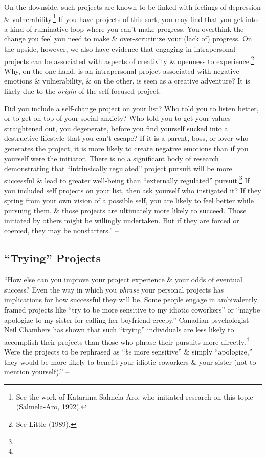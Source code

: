 \documentclass{article}
\numberwithin{equation}{section}
\begin{document}
On the downside, such projects are known to be linked with feelings of depression \& vulnerability.\footnote{See the work of Katariina Salmela-Aro, who initiated research on this topic (Salmela-Aro, 1992).} If you have projects of this sort, you may find that you get into a kind of ruminative loop where you can't make progress. You overthink the change you feel you need to make \& over-scrutinize your (lack of) progress. On the upside, however, we also have evidence that engaging in intrapersonal projects can be associated with aspects of creativity \& openness to experience.\footnote{See Little (1989).} Why, on the one hand, is an intrapersonal project associated with negative emotions \& vulnerability, \& on the other, is seen as a creative adventure? It is likely due to the \textit{origin} of the self-focused project.

Did you include a self-change project on your list? Who told you to listen better, or to get on top of your social anxiety? Who told you to get your values straightened out, you degenerate, before you find yourself sucked into a destructive lifestyle that you can't escape? If it is a parent, boss, or lover who generates the project, it is more likely to create negative emotions than if you yourself were the initiator. There is no a significant body of research demonstrating that ``intrinsically regulated'' project pursuit will be more successful \& lead to greater well-being than ``externally regulated'' pursuit.\footnote{} If you included self projects on your list, then ask yourself who instigated it? If they spring from your own vision of a possible self, you are likely to feel better while pursuing them. \& those projects are ultimately more likely to succeed. Those initiated by others might be willingly undertaken. But if they are forced or coerced, they may be nonstarters.'' -- \cite[pp. 32--33]{Little2017}

\subsection{``Trying'' Projects}
``How else can you improve your project experience \& your odds of eventual success? Even the way in which you \textit{phrase} your personal projects has implications for how successful they will be. Some people engage in ambivalently framed projects like ``try to be more sensitive to my idiotic coworkers'' or ``maybe apologize to my sister for calling her boyfriend creepy.'' Canadian psychologist Neil Chambers has shown that such ``trying'' individuals are less likely to accomplish their projects than those who phrase their pursuits more directly.\footnote{} Were the projects to be rephrased as ``\textit{be} more sensitive'' \& simply ``apologize,'' they would be more likely to benefit your idiotic coworkers \& your sister (not to mention yourself).'' -- \cite[p. 33]{Little2017}
\end{document}
